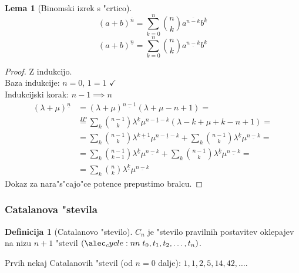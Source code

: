 \documentclass[a4paper,12pt]{article}
\theoremstyle{definition}
\newtheorem{defn}[counter]{Definicija}
\newtheorem{lemma}[counter]{Lema}
\theoremstyle{remark}
\begin{document}
\begin{lemma}[Binomski izrek s "crtico]
	\[(a+b)^{\overline{n}} = \sum_{k=0}^n \binom{n}{k}a^{\overline{n-k}} b^{\overline{k}}\]
	\[(a+b)^{\underline{n}} = \sum_{k=0}^n \binom{n}{k}a^{\underline{n-k}} b^{\underline{k}}\]
\end{lemma}
\begin{proof}
    Z indukcijo.\\
    Baza indukcije: $n = 0$, $1 = 1$ $\checkmark$\\
    Indukcijski korak: $n - 1 \implies n$
    \begin{align*}
        (\lambda + \mu)^{\underline{n}} & = (\lambda + \mu)^{\underline{n - 1}}(\lambda + \mu - n + 1) =\\
        & \overset{IP}{=} \sum_k \binom{n - 1}{k} \lambda^{\underline{k}} \mu^{\underline{n - 1 - k}} (\lambda - k + \mu + k - n + 1) = \\
        & = \sum_k \binom{n - 1}{k} \lambda^{\underline{k + 1}} \mu^{\underline{n - 1 - k}} + \sum_k \binom{n - 1}{k} \lambda^{\underline{k}} \mu^{\underline{n - k}} =\\
        & = \sum_k \binom{n - 1}{k - 1} \lambda^{\underline{k}} \mu^{\underline{n - k}} + \sum_k \binom{n - 1}{k} \lambda^{\underline{k}} \mu^{\underline{n - k}} = \\
        & = \sum_k \binom{n}{k} \lambda^{\underline{k}} \mu^{\underline{n - k}}
    \end{align*}
	Dokaz za nara"s"cajo"ce potence prepustimo bralcu.
\end{proof}

\label{TODO: tega ni blo lani in ne razumm, tkoda se ne bom s tem ukvarju}



\label{TODO: again, kaj je to? (commented out)}

\subsubsection{Catalanova "stevila}
\begin{defn}[Catalanovo "stevilo]
	$C_n$ je "stevilo pravilnih postavitev oklepajev na nizu $n+1$ "stevil $\cycle{t_0, t_1, t_2, \ldots, t_n}$.
	
	Prvih nekaj Catalanovih "stevil (od $n=0$ dalje): $1, 1, 2, 5, 14, 42, \ldots$.
\end{defn}
\end{document}
